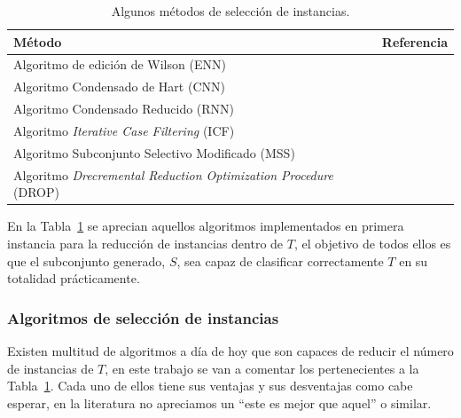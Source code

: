 \begin{table}[]
\small
\begin{center}
	\begin{tabular}{lc}
	\toprule
	\rowcolor[HTML]{EFEFEF} 
	\textbf{Método}    & \textbf{Referencia} \\ \midrule
	Algoritmo de edición de Wilson (ENN)              &~\cite{wilson1972asymptotic}\\ \midrule
	\rowcolor[HTML]{EFEFEF} 
	Algoritmo Condensado de Hart (CNN)              &~\cite{hart1968condensed}\\ \midrule
	Algoritmo Condensado Reducido (RNN)              &~\cite{gates1972reduced}  \\ \midrule
	\rowcolor[HTML]{EFEFEF} 
	Algoritmo \textit{Iterative Case Filtering} (ICF)                   &~\cite{brighton2002advances}\\ \midrule
	Algoritmo Subconjunto Selectivo Modificado (MSS)                 &~\cite{barandela2005decision}\\ \midrule
	\rowcolor[HTML]{EFEFEF} 
	Algoritmo \textit{Drecremental Reduction Optimization Procedure} (DROP) &~\cite{wilson2000reduction} \\ \bottomrule
	\end{tabular}
\end{center}
\caption{Algunos métodos de selección de instancias.}
\label{tab:instance-selection-methods}
\end{table}

En la Tabla~\ref{tab:instance-selection-methods} se aprecian aquellos algoritmos implementados en primera instancia para la reducción de instancias dentro de $T$, el objetivo de todos ellos es que el subconjunto generado, $S$, sea capaz de clasificar correctamente  $T$ en su totalidad prácticamente.

\subsubsection{Algoritmos de selección de instancias}\label{subsubsec:Instance-Selection-Algorithms}
Existen multitud de algoritmos a día de hoy que son capaces de reducir el número de instancias de $T$, en este trabajo se van a comentar los pertenecientes a la Tabla~\ref{tab:instance-selection-methods}. Cada uno de ellos tiene sus ventajas y sus desventajas como cabe esperar, en la literatura no apreciamos un ``este es mejor que aquel'' o similar.

